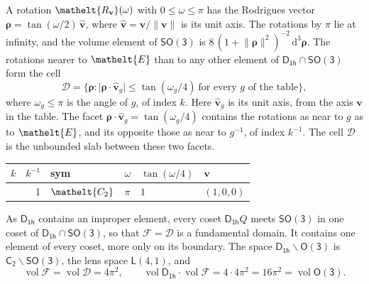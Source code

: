 \documentclass[10pt,a4paper]{article}
\numberwithin{equation}{section}
\newcommand{\eltfont}[1]{{\let\sigma\eltsigma\mathelt{#1}}}
\newcommand{\grp}[1]{\mathsf{#1}}
\newcommand{\cls}[1]{\eltfont{#1}}
\newcommand{\elt}[1]{\eltfont{#1}}
\newcommand{\dirvec}[3]{(#1, #2, #3)}
\newcommand{\unitaxis}{\hat{\mathbf{v}}}
\newcommand{\vv}{\mathbf{v}}
\newcommand{\diff}{\mathrm{d}}
\newcommand{\vol}{\operatorname{vol}}
\newcommand{\rodrigues}{\boldsymbol{\rho}}
\newcommand{\fcell}{\mathcal{D}}
\newcommand{\fdomain}{\mathcal{F}}
\newcommand{\lensspace}[2]{\mathsf{L}(#1, #2)}
\begin{document}
\leavevmode\label{n:vector.rodrigues}\label{n:vector.unitaxis}A rotation $\elt{R_{\vv}}(\omega)$ with $0 \le \omega \le \pi$ has the Rodrigues vector $\rodrigues = \tan(\omega/2)\,\unitaxis$, where $\unitaxis = \vv/\lVert\vv\rVert$ is its unit axis. The rotations by $\pi$ lie at infinity, and the volume element of \href{SO3.pdf}{$\grp{SO(3)}$} is $8\,(1 + \lVert\rodrigues\rVert^2)^{-2}\,\diff^3\rodrigues$.
\leavevmode\label{n:set.cell}The rotations nearer to $\elt{E}$ than to any other element of $\grp{D_{1h}} \cap \grp{SO(3)}$ form the cell
\begin{equation}\label{e:cell}\fcell = \bigl\{\rodrigues : \lvert\rodrigues\cdot\unitaxis_g\rvert \le \tan(\omega_g/4)\ \text{for every $g$ of the table}\bigr\},\end{equation}
where $\omega_g \le \pi$ is the angle of $g$, of index $k$. Here $\unitaxis_g$ is its unit axis, from the axis $\vv$ in the table. The facet $\rodrigues\cdot\unitaxis_g = \tan(\omega_g/4)$ contains the rotations as near to $g$ as to $\elt{E}$, and its opposite those as near to $g^{-1}$, of index $k^{-1}$. The cell $\fcell$ is the unbounded slab between these two facets.
{\small\begin{longtable}{@{}rrllll@{}}\toprule
$k$ & $k^{-1}$ & sym & $\omega$ & $\tan(\omega/4)$ & $\vv$\\\midrule\endhead
\bottomrule\endfoot\endlastfoot
1 & 1 & $\cls{C_{2}}$ & $\pi$ & $1$ & $\dirvec{1}{0}{0}$\\
\bottomrule\end{longtable}}

\leavevmode\label{n:set.fundamental}As $\grp{D_{1h}}$ contains an improper element, every coset $\grp{D_{1h}}Q$ meets \href{SO3.pdf}{$\grp{SO(3)}$} in one coset of $\grp{D_{1h}} \cap \grp{SO(3)}$, so that $\fdomain = \fcell$ is a fundamental domain. It contains one element of every coset, more only on its boundary.
\leavevmode\label{n:set.lens}The space $\grp{D_{1h}}\backslash\grp{O(3)}$ is $\grp{C_{2}}\backslash\grp{SO(3)}$, the lens space $\lensspace{4}{1}$, and
\begin{equation}\label{e:volume}\vol\fdomain = \vol\fcell = 4\pi^2,\qquad \vol\grp{D_{1h}}\cdot\vol\fdomain = 4\cdot 4\pi^2 = 16\pi^2 = \vol\grp{O(3)}.\end{equation}
\end{document}
